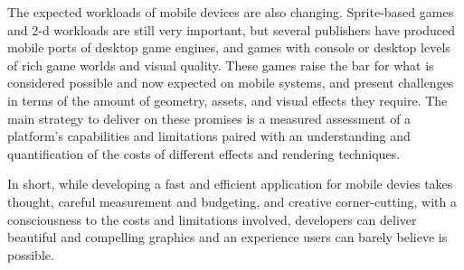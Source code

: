 The expected workloads of mobile devices are also changing.  Sprite-based games
and 2-d workloads are still very important, but several publishers have
produced mobile ports of desktop game engines, and games with console or
desktop levels of rich game worlds and visual quality.  These games raise the
bar for what is considered possible and now expected on mobile systems, and
present challenges in terms of the amount of geometry, assets, and visual
effects they require.  The main strategy to deliver on these promises is a
measured assessment of a platform's capabilities and limitations paired with an
understanding and quantification of the costs of different effects and
rendering techniques.  

In short, while developing a fast and efficient application for mobile devies
takes thought, careful measurement and budgeting, and creative corner-cutting,
with a consciousness to the costs and limitations involved, developers can
deliver beautiful and compelling graphics and an experience users can barely
believe is possible.

 











